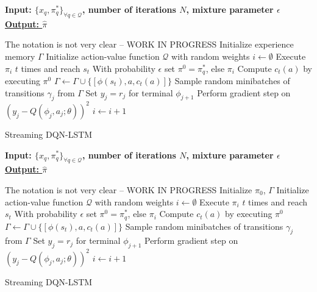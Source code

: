 \documentclass[12pt]{article}
\begin{document}
\begin{algorithm}
    \bf{Input:} { \rm $\{ x_q, \pi^{*}_q \}_{\forall q \in \mathcal{Q} }$, number of iterations $N$, mixture parameter $\epsilon$  } \\
    \underline{\bf{Output:}  $\hat{\pi}$ }
  \begin{algorithmic}[1]
  \STATE The notation is not very clear -- WORK IN PROGRESS
  \STATE \rm Initialize experience memory $\Gamma$
  \STATE \rm Initialize action-value function $\mathcal{Q}$ with random weights
    \STATE \rm $i \leftarrow \emptyset$ 
        \STATE \rm Execute $\pi_i$ $t$ times and reach $s_t$
        		\STATE \rm With probability $\epsilon$ set $\pi^0 = \pi^{*}_q$, else $\pi_i$
		\STATE Compute $c_t(a)$ by executing $\pi^0$
		\STATE $\Gamma \leftarrow \Gamma \cup \{ [\phi(s_t), a, c_t(a)]\}$
		\ENDFOR
        \ENDFOR
        \STATE Sample random minibatches of transitions $\gamma_j$ from $\Gamma$
        \STATE Set $y_j = r_j$ for terminal $\phi_{j+1}$
        \STATE Perform gradient step on $(y_j - Q(\phi_j, a_j; \theta))^2$
        \STATE $i \leftarrow i + 1$
      \ENDFOR
    \ENDFOR
  \end{algorithmic}
    \caption{Streaming DQN-LSTM}
\end{algorithm}


\begin{algorithm}
    \bf{Input:} { \rm $\{ x_q, \pi^{*}_q \}_{\forall q \in \mathcal{Q} }$, number of iterations $N$, mixture parameter $\epsilon$  } \\
    \underline{\bf{Output:}  $\hat{\pi}$ }
  \begin{algorithmic}[1]
  \STATE The notation is not very clear -- WORK IN PROGRESS
  \STATE \rm Initialize $\pi_0$, $\Gamma$
  \STATE \rm Initialize action-value function $\mathcal{Q}$ with random weights
    \STATE \rm $i \leftarrow \emptyset$ 
        \STATE \rm Execute $\pi_i$ $t$ times and reach $s_t$
        		\STATE \rm With probability $\epsilon$ set $\pi^0 = \pi^{*}_q$, else $\pi_i$
		\STATE Compute $c_t(a)$ by executing $\pi^0$
		\STATE $\Gamma \leftarrow \Gamma \cup \{ [\phi(s_t), a, c_t(a)]\}$
		\ENDFOR
        \ENDFOR
        \STATE Sample random minibatches of transitions $\gamma_j$ from $\Gamma$
        \STATE Set $y_j = r_j$ for terminal $\phi_{j+1}$
        \STATE Perform gradient step on $(y_j - Q(\phi_j, a_j; \theta))^2$
        \STATE $i \leftarrow i + 1$
      \ENDFOR
    \ENDFOR
  \end{algorithmic}
    \caption{Streaming DQN-LSTM}
\end{algorithm}
\end{document}
